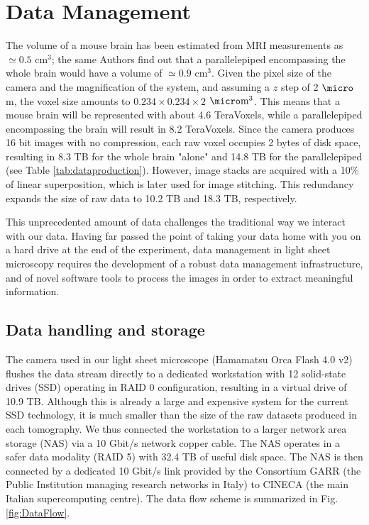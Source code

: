 \documentclass[12pt]{spieman}  %
\begin{document}
\section{Data Management}

The volume of a mouse brain has been estimated from MRI measurements \cite{Kovacevic2005} as $\simeq 0.5$ $\text{cm}^3$; the same Authors find out that a parallelepiped encompassing the whole brain would have a volume of $\simeq 0.9$ $\text{cm}^3$. Given the pixel size of the camera and the magnification of the system, and assuming a $z$ step of 2 $\micro$m, the voxel size amounts to $0.234\times0.234\times2$ $\micro\text{m}^3$. This means that a mouse brain will be represented with about 4.6 TeraVoxels, while a parallelepiped encompassing the brain will result in 8.2 TeraVoxels. Since the camera produces 16 bit images with no compression, each raw voxel occupies 2 bytes of disk space, resulting in 8.3 TB for the whole brain "alone" and 14.8 TB for the parallelepiped (see Table \ref{tab:dataproduction}). However, image stacks are acquired with a 10\% of linear superposition, which is later used for image stitching. This redundancy expands the size of raw data to 10.2 TB and 18.3 TB, respectively.

This unprecedented amount of data challenges the traditional way we interact with our data. Having far passed the point of taking your data home with you on a hard drive at the end of the experiment, data management in light sheet microscopy requires the development of a robust data management infrastructure, and of novel software tools to process the images in order to extract meaningful information.

\subsection{Data handling and storage}

The camera used in our light sheet microscope (Hamamatsu Orca Flash 4.0 v2) flushes the data stream directly to a dedicated workstation with 12 solid-state drives (SSD) operating in RAID 0 configuration, resulting in a virtual drive of 10.9 TB. Although this is already a large and expensive system for the current SSD technology, it is much smaller than the size of the raw datasets produced in each tomography. We thus connected the workstation to a larger network area storage (NAS) via a 10 Gbit/s network copper cable. The NAS operates in a safer data modality (RAID 5) with 32.4 TB of useful disk space. The NAS is then connected by a dedicated 10 Gbit/s link provided by the Consortium GARR (the Public Institution managing research networks in Italy) to CINECA (the main Italian supercomputing centre). The data flow scheme is summarized in Fig. \ref{fig:DataFlow}.
\end{document}
